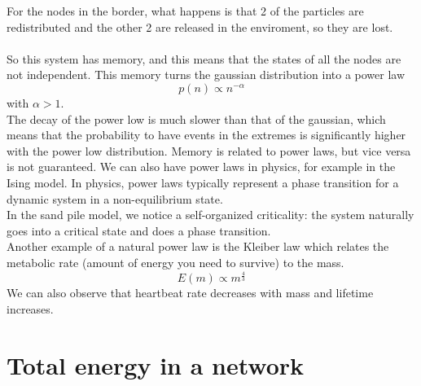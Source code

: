 For the nodes in the border, what happens is that 2 of the particles are redistributed and the other 2 are released in the enviroment, so they are lost. \\ \\
So this system has memory, and this means that the states of all the nodes are not independent. This memory turns the gaussian distribution into a power law
$$
	p(n) \propto n^{-\alpha}
$$
with $\alpha > 1$. \\
The decay of the power low is much slower than that of the gaussian, which means that the probability to have events in the extremes is significantly higher with the power low distribution.
Memory is related to power laws, but vice versa is not guaranteed.
We can also have power laws in physics, for example in the Ising model.
In physics, power laws typically represent a phase transition for a dynamic system in a non-equilibrium state. \\
In the sand pile model, we notice a self-organized criticality: the system naturally goes into a critical state and does a phase transition. \\
Another example of a natural power law is the Kleiber law which relates the metabolic rate (amount of energy you need to survive) to the mass.
\begin{equation}
	E(m) \propto m^{\frac{4}{3}}
\end{equation}
We can also observe that heartbeat rate decreases with mass and lifetime increases.
\section{Total energy in a network}